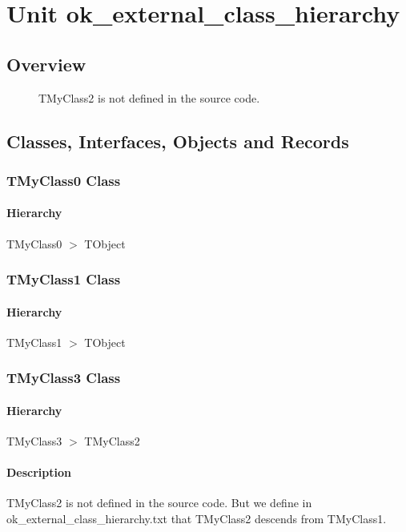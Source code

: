 \documentclass{report}
\begin{document}
\newlength{\tmplength}
\chapter{Unit ok{\_}external{\_}class{\_}hierarchy}
\section{Overview}
\begin{description}
\item[\texttt{\begin{ttfamily}TMyClass0\end{ttfamily} Class}]
\item[\texttt{\begin{ttfamily}TMyClass1\end{ttfamily} Class}]
\item[\texttt{\begin{ttfamily}TMyClass3\end{ttfamily} Class}]TMyClass2 is not defined in the source code.
\end{description}
\section{Classes, Interfaces, Objects and Records}
\subsection*{TMyClass0 Class}
\subsubsection*{\large{\textbf{Hierarchy}}\normalsize\hspace{1ex}\hfill}
TMyClass0 {$>$} TObject
\subsection*{TMyClass1 Class}
\subsubsection*{\large{\textbf{Hierarchy}}\normalsize\hspace{1ex}\hfill}
TMyClass1 {$>$} TObject
\subsection*{TMyClass3 Class}
\subsubsection*{\large{\textbf{Hierarchy}}\normalsize\hspace{1ex}\hfill}
TMyClass3 {$>$} TMyClass2
\subsubsection*{\large{\textbf{Description}}\normalsize\hspace{1ex}\hfill}
TMyClass2 is not defined in the source code. But we define in ok{\_}external{\_}class{\_}hierarchy.txt that TMyClass2 descends from TMyClass1.
\end{document}
